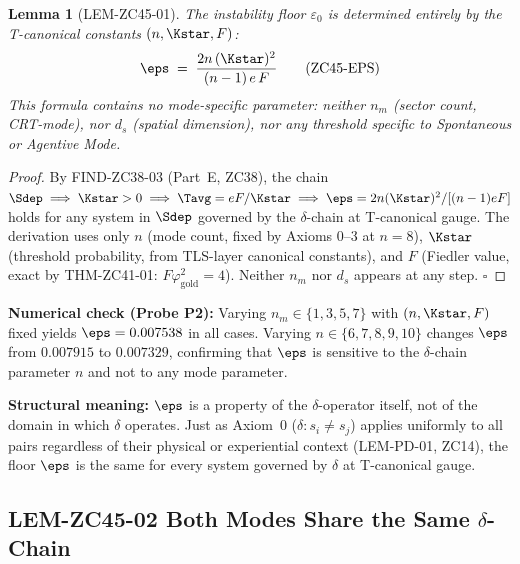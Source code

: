 \documentclass[12pt, a4paper]{article}
\newtheorem{lemma}{Lemma}[section]
\begin{document}

\begin{formalbox}[title={LEM-ZC45-01: $\varepsilon_0$ Derives
  Exclusively from T-Canonical Constants (Exact)}]

\begin{lemma}[LEM-ZC45-01]
\label{lem:zc45-01}
The instability floor $\varepsilon_0$ is determined entirely
by the T-canonical constants $(n, \Kstar, F)$:
\begin{equation}
  \eps \;=\; \frac{2n\,(\Kstar)^2}{(n-1)\,e\,F}
  \tag{ZC45-EPS}\label{eq:eps-chain}
\end{equation}
This formula contains no mode-specific parameter: neither
$n_m$ (sector count, CRT-mode), nor $d_s$ (spatial dimension),
nor any threshold specific to Spontaneous or Agentive Mode.
\end{lemma}

\begin{proof}
By FIND-ZC38-03 (Part~E, ZC38), the chain
$\Sdep \implies \Kstar > 0 \implies \Tavg = eF/\Kstar
\implies \eps = 2n(\Kstar)^2/[(n-1)eF]$
holds for any system in $\Sdep$ governed by the $\delta$-chain
at T-canonical gauge.
The derivation uses only $n$ (mode count, fixed by Axioms
0--3 at $n=8$), $\Kstar$ (threshold probability, from
TLS-layer canonical constants), and $F$ (Fiedler value, exact
by THM-ZC41-01: $F\varphi_{\mathrm{gold}}^2 = 4$).
Neither $n_m$ nor $d_s$ appears at any step.
\hfill$\square$
\end{proof}

\textbf{Numerical check (Probe P2):}
Varying $n_m \in \{1, 3, 5, 7\}$ with $(n, \Kstar, F)$ fixed
yields $\eps = 0.007538$ in all cases.
Varying $n \in \{6, 7, 8, 9, 10\}$ changes $\eps$ from
$0.007915$ to $0.007329$, confirming that $\eps$ is sensitive
to the $\delta$-chain parameter $n$ and not to any mode parameter.

\textbf{Structural meaning:}
$\eps$ is a property of the $\delta$-operator itself, not of the
domain in which $\delta$ operates. Just as Axiom~0
($\delta: s_i \neq s_j$) applies uniformly to all pairs
regardless of their physical or experiential context
(LEM-PD-01, ZC14), the floor $\eps$ is the same for every
system governed by $\delta$ at T-canonical gauge.
\end{formalbox}

\subsection{LEM-ZC45-02 \quad Both Modes Share the Same $\delta$-Chain}
\end{document}
